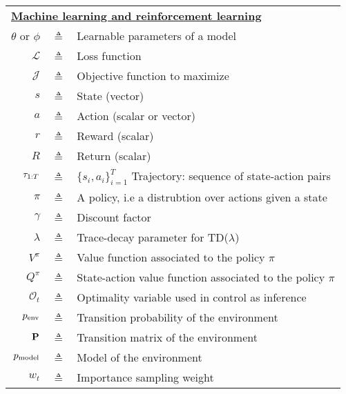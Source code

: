 \begin{table}[H]
\begin{center}
\begin{tabular}{r c >{\raggedright\arraybackslash}p{10cm}}
\midrule
    \multicolumn{3}{l}{\textbf{\underline{Machine learning and reinforcement
    learning}}} \\
$\theta$ or $\phi$ & $\triangleq$ & Learnable parameters of a model\\
$\mathcal{L}$ & $\triangleq$ & Loss function\\
$\mathcal{J}$ & $\triangleq$ & Objective function to maximize\\
$s$  & $\triangleq$ & State (vector)\\
$a$  & $\triangleq$ & Action (scalar or vector)\\
$r$  & $\triangleq$ & Reward (scalar) \\
$R$  & $\triangleq$ & Return (scalar) \\
$\tau_{1:T}$ & $\triangleq$ & $\{s_i, a_i\}_{i=1}^T$ Trajectory: sequence of state-action pairs\\
$\pi$ & $\triangleq$ & A policy, i.e a distrubtion over actions given a state\\
$\gamma$ & $\triangleq$ & Discount factor\\
$\lambda$ & $\triangleq$ & Trace-decay parameter for TD($\lambda$)\\
$V^\pi$  & $\triangleq$ & Value function associated to the policy $\pi$\\
$Q^\pi$  & $\triangleq$ & State-action value function associated to the policy $\pi$\\
$\mathcal{O}_t$ & $\triangleq$ & Optimality variable used in control as
    inference\\
$p_{\text{env}}$ & $\triangleq$ & Transition probability of the environment\\
${\mathbf{P}}$ & $\triangleq$ & Transition matrix of the environment\\
$p_{\rm{model}}$ & $\triangleq$ & Model of the environment\\
$w_t$ & $\triangleq$ & Importance sampling weight\\ 

\bottomrule
\end{tabular}
\end{center}
\label{tab:notation}
\end{table}

